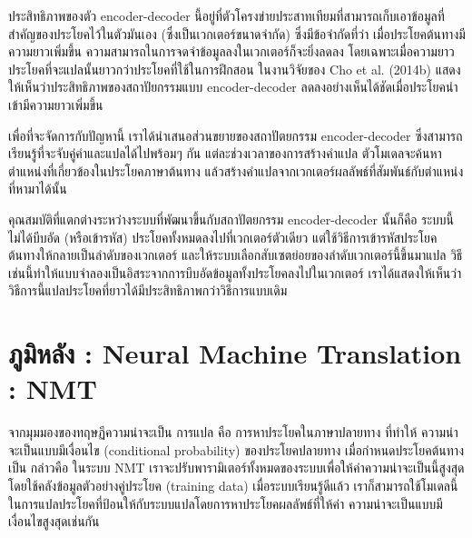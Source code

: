 \documentclass[17pt,fancychapters]{report}
\begin{document}
ประสิทธิภาพของตัว encoder-decoder นี้อยู่ที่ตัวโครงข่ายประสาทเทียมที่สามารถเก็บเอาข้อมูลที่สำคัญของประโยคไว้ในตัวมันเอง (ซึ่งเป็นเวกเตอร์ขนาดจำกัด) ซึ่งมีข้อจำกัดที่ว่า เมื่อประโยคต้นทางมีความยาวเพิ่มขึ้น ความสามารถในการจดจำข้อมูลลงในเวกเตอร์ก็จะยิ่งลดลง โดยเฉพาะเมื่อความยาวประโยคที่จะแปลนั้นยาวกว่าประโยคที่ใช้ในการฝึกสอน ในงานวิจัยของ Cho et al. (2014b) แสดงให้เห็นว่าประสิทธิภาพของสถาปัยกรรมแบบ encoder-decoder ลดลงอย่างเห็นได้ชัดเมื่อประโยคนำเข้ามีความยาวเพิ่มขึ้น

เพื่อที่จะจัดการกับปัญหานี้ เราได้นำเสนอส่วนขยายของสถาปัตยกรรม encoder-decoder ซึ่งสามารถเรียนรู้ที่จะจับคู่คำและแปลได้ไปพร้อมๆ กัน แต่ละช่วงเวลาของการสร้างคำแปล ตัวโมเดลจะค้นหาตำแหน่งที่เกี่ยวข้องในประโยคภาษาต้นทาง แล้วสร้างคำแปลจากเวกเตอร์ผลลัพธ์ที่สัมพันธ์กับตำแหน่งที่หามาได้นั้น

คุณสมบัติที่แตกต่างระหว่างระบบที่พัฒนาขึ้นกับสถาปัตยกรรม encoder-decoder นั้นก็คือ ระบบนี้ไม่ได้บีบอัด (หรือเข้ารหัส) ประโยคทั้งหมดลงไปที่เวกเตอร์ตัวเดียว แต่ใช้วิธีการเข้ารหัสประโยคต้นทางให้กลายเป็นลำดับของเวกเตอร์ และให้ระบบเลือกสับเซตย่อยของลำดับเวกเตอร์นี้ขึ้นมาแปล วิธีเช่นนี้ทำให้แบบจำลองเป็นอิสระจากการบีบอัดข้อมูลทั้งประโยคลงไปในเวกเตอร์ เราได้แสดงให้เห็นว่าวิธีการนี้แปลประโยคที่ยาวได้มีประสิทธิภาพกว่าวิธีการแบบเดิม

\section{ภูมิหลัง : Neural Machine Translation : NMT}

จากมุมมองของทฤษฏีความน่าจะเป็น การแปล คือ การหาประโยคในภาษาปลายทาง   ที่ทำให้ ความน่าจะเป็นแบบมีเงื่อนไข (conditional probability) ของประโยคปลายทาง  เมื่อกำหนดประโยคต้นทางเป็น  กล่าวคือ 
 ในระบบ NMT เราจะปรับพารามิเตอร์ทั้งหมดของระบบเพื่อให้ค่าความน่าจะเป็นนี้สูงสุดโดยใช้คลังข้อมูลตัวอย่างคู่ประโยค (training data) เมื่อระบบเรียนรู้ดีแล้ว เราก็สามารถใช้โมเดลนี้ในการแปลประโยคที่ป้อนให้กับระบบแปลโดยการหาประโยคผลลัพธ์ที่ให้ค่า ความน่าจะเป็นแบบมีเงื่อนไขสูงสุดเช่นกัน
\end{document}
